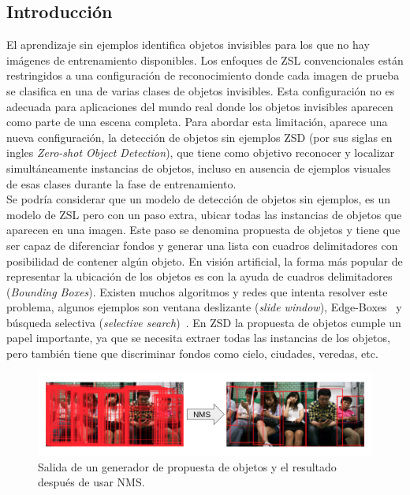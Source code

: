 \subsection{Introducción} 
El aprendizaje sin ejemplos identifica objetos invisibles para los que no hay imágenes de entrenamiento disponibles. Los enfoques de ZSL convencionales están restringidos a una configuración de reconocimiento donde cada imagen de prueba se clasifica en una de varias clases de objetos invisibles. Esta configuración no es adecuada para aplicaciones del mundo real donde los objetos invisibles aparecen como parte de una escena completa. Para abordar esta limitación, aparece una nueva configuración, la detección de objetos sin ejemplos ZSD (por sus siglas en ingles \textit{Zero-shot Object Detection}), que tiene como objetivo reconocer y localizar simultáneamente instancias de objetos, incluso en ausencia de ejemplos visuales de esas clases durante la fase de entrenamiento.\\

Se podría considerar que un modelo de detección de objetos sin ejemplos, es un modelo de ZSL pero con un paso extra, ubicar todas las instancias de objetos que aparecen en una imagen. Este paso se denomina propuesta de objetos y tiene que ser capaz de diferenciar fondos y generar una lista con cuadros delimitadores con posibilidad de contener algún objeto. En visión artificial, la forma más popular de representar la ubicación de los objetos es con la ayuda de cuadros delimitadores (\textit{Bounding Boxes}). Existen muchos algoritmos y redes que intenta resolver este problema, algunos ejemplos son ventana deslizante (\textit{slide window}), Edge-Boxes~\cite{zitnick2014edge} y búsqueda selectiva (\textit{selective search})~\cite{uijlings2013selective}. En ZSD la propuesta de objetos cumple un papel importante, ya que se necesita extraer todas las instancias de los objetos, pero también tiene que discriminar fondos como cielo, ciudades, veredas, etc.\\ 

\begin{figure}[]
	\centering
	\includegraphics[width=1\textwidth]{img/NMS.png}
	\caption{Salida de un generador de propuesta de objetos y el resultado después de  usar NMS.}
	\label{fig:NMS}
\end{figure}

